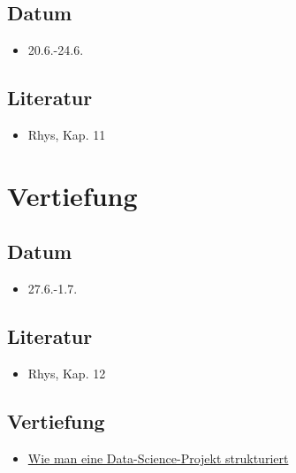 \documentclass[
]{book}
\providecommand{\tightlist}{%
  \setlength{\itemsep}{0pt}\setlength{\parskip}{0pt}}
\begin{document}
\hypertarget{datum-13}{%
\subsection{Datum}\label{datum-13}}

\begin{itemize}
\tightlist
\item
  20.6.-24.6.
\end{itemize}

\hypertarget{literatur-12}{%
\subsection{Literatur}\label{literatur-12}}

\begin{itemize}
\tightlist
\item
  Rhys, Kap. 11
\end{itemize}

\hypertarget{vertiefung-2}{%
\section{Vertiefung}\label{vertiefung-2}}

\hypertarget{datum-14}{%
\subsection{Datum}\label{datum-14}}

\begin{itemize}
\tightlist
\item
  27.6.-1.7.
\end{itemize}

\hypertarget{literatur-13}{%
\subsection{Literatur}\label{literatur-13}}

\begin{itemize}
\tightlist
\item
  Rhys, Kap. 12
\end{itemize}

\hypertarget{vertiefung-3}{%
\subsection{Vertiefung}\label{vertiefung-3}}

\begin{itemize}
\tightlist
\item
  \href{https://medium.com/swlh/how-to-structure-a-python-based-data-science-project-a-short-tutorial-for-beginners-7e00bff14f56}{Wie man eine Data-Science-Projekt strukturiert}
\end{itemize}
\end{document}
